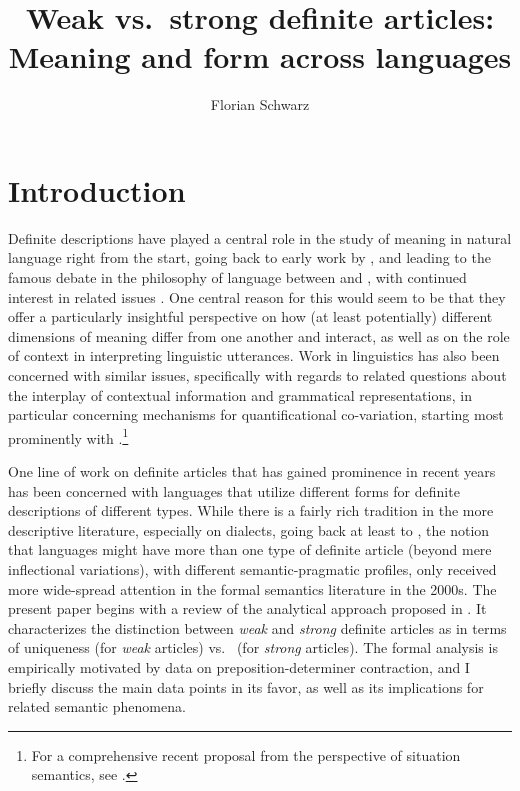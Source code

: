 \documentclass[output=paper
,modfonts
,nonflat]{langscibook}
\title{Weak vs.\ strong definite articles: Meaning and form across languages}
\author{Florian Schwarz\affiliation{University of Pennsylvania}}
\begin{document}
\maketitle
\section{Introduction}
Definite descriptions have played a central role in the study of
meaning in natural language right from the start, going back to
early work by \citet{Frege1892}, and leading to the famous debate in
the philosophy of language between
\citet{Russell1905} and \citet{Strawson1950}, with continued interest
in related issues \citep[for an extensive collection, see][]{Reimer2004} . One central reason for
this would seem to be that they offer a particularly insightful
perspective on how (at least potentially) different dimensions of
meaning differ from one another and interact, as well as on the role
of context in interpreting linguistic utterances. Work
in linguistics has also been concerned with similar issues,
specifically with regards to related questions about the interplay
of contextual information and grammatical representations,
in particular concerning mechanisms for quantificational
co-variation, starting most prominently
with \citet{Heim1982}.\footnote{For a comprehensive recent proposal from the perspective of situation semantics, see \citet{Elbourne2013}.}


One line of work on definite articles that has gained prominence in
recent years has been concerned with languages that utilize different
forms for definite descriptions of different types. While there is a
fairly rich tradition in the more descriptive literature, especially
on  dialects, going back at least to \citet{Heinrichs1954}, the
notion that languages might have more than one type of definite
article (beyond mere inflectional variations), with different
semantic-pragmatic profiles, only received more wide-spread attention
in the formal semantics literature in the 2000s. The present paper
begins with a review of the analytical approach proposed in
\citet{Schwarz2009}. It characterizes the distinction between \textit{weak}
and \textit{strong} definite articles as in terms of
uniqueness (for \textit{weak} articles) vs.\  (for \textit{strong}
articles). The formal analysis is empirically motivated by  data on
 preposition-determiner contraction, and I briefly discuss the
main data points in its favor, as well as its implications for related
semantic phenomena. 
\end{document}
